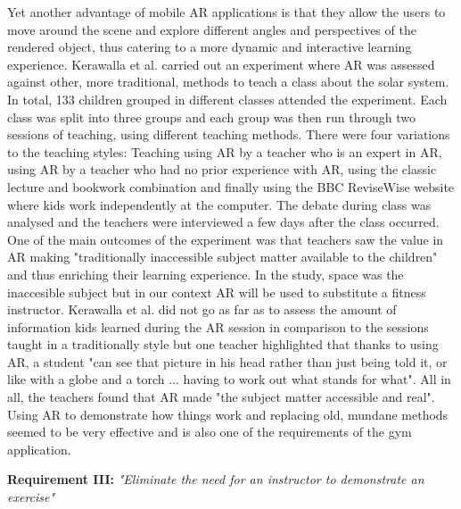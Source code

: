 \documentclass{l4proj}
\begin{document}
Yet another advantage of mobile AR applications is that they allow the users to move around the scene and explore different angles and perspectives of the rendered object, thus catering to a more dynamic and interactive learning experience\cite{fitzgerald_augmented_2013}\cite{dede_immersive_2009}. Kerawalla et al. carried out an experiment where AR was assessed against other, more traditional, methods to teach a class about the solar system\cite{kerawalla_making_2006}. In total, 133 children grouped in different classes attended the experiment. Each class was split into three groups and each group was then run through two sessions of teaching, using different teaching methods. There were four variations to the teaching styles: Teaching using AR by a teacher who is an expert in AR, using AR by a teacher who had no prior experience with AR, using the classic lecture and bookwork combination and finally using the BBC ReviseWise website where kids work independently at the computer. The debate during class was analysed and the teachers were interviewed a few days after the class occurred. One of the main outcomes of the experiment was that teachers saw the value in AR making "traditionally inaccessible subject matter available to the children"\cite{kerawalla_making_2006} and thus enriching their learning experience. In the study, space was the inaccesible subject but in our context AR will be used to substitute a fitness instructor. Kerawalla et al. did not go as far as to assess the amount of information kids learned during the AR session in comparison to the sessions taught in a traditionally style but one teacher highlighted that thanks to using AR, a student "can see that picture in his head rather than just being told it, or like with a globe and a torch ... having to work out what stands for what"\cite{kerawalla_making_2006}. All in all, the teachers found that AR made "the  subject  matter  accessible  and real". Using AR to demonstrate how things work and replacing old, mundane methods seemed to be very effective and is also one of the requirements of the gym application.  

\textbf{Requirement III:} \textit{"Eliminate the need for an instructor to demonstrate an exercise"}
\end{document}
